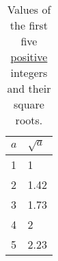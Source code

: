 \begin{table}
    \centering
    \begin{tabular}{|l||l|}
        \hline
        $a$  & $\sqrt{a}$  \\ \hline
        1 & 1 \\ \hline
        2 & 1.42 \\ \hline
        3 & 1.73 \\ \hline
        4 & 2 \\ \hline
        5 & 2.23 \\ \hline
    \end{tabular}
    \label{sqrt}
    \caption{Values of the first five \underline{positive} integers and their square roots.}
\end{table}